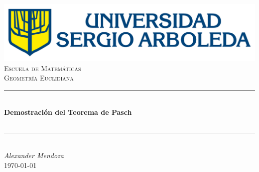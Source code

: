 \documentclass[11pt]{article}
\begin{document}
    \begin{titlepage}

        \newcommand{\HRule}{\rule{\linewidth}{0.5mm}}
        \newcommand{\department}{Escuela de Matemáticas}
        \newcommand{\course}{Geometría Euclidiana}
        \newcommand{\titleValue}{Demostración del Teorema de Pasch}
        \newcommand{\subtitleValue}{}
        \newcommand{\authorName}{Alexander Mendoza}

        \center


        \includegraphics{images/logo_usa.png}
        \vspace{0.5cm}
        \textsc{\Large \department}\\[0.5cm]
        \textsc{\Large \course}\\[0.5cm]
        \vfill


        \HRule\\
        \Huge
        \textbf{\titleValue}\\[0.5cm]
        \Large
        \textbf{\subtitleValue}\\
        \HRule\\[0.5cm]


        \vfill
        \Large
        \textit{\authorName}\\
        {\large \today}\\[2cm]

    \end{titlepage}
\end{document}
